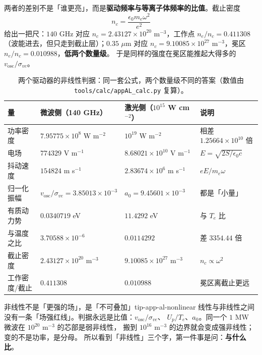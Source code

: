 两者的差别不是「谁更亮」，而是\textbf{驱动频率与等离子体频率的比值}。截止密度
\begin{equation}
n_c = \frac{\epsilon_0m_e\omega^2}{e^2}
\label{eq:app-al-nc}
\end{equation}
给出一把尺：$140$ GHz 对应 $n_c = 2.43127\times10^{20}$ m$^{-3}$，工作点
$n_e/n_c = 0.411308$（波能进去，但只走到截止层）；$0.35$ $\mu$m 对应
$n_c = 9.10085\times10^{27}$ m$^{-3}$，冕区 $n_e/n_c = 0.010988$，\textbf{低两个数量级}。
于是同样的强度在冕区能推起大得多的 $v_{\mathrm{osc}}/\sigma_{ve}$。

\begin{table}[htbp]
\centering
\small
\caption{两个驱动器的非线性判据：同一套公式，两个数量级不同的答案（数值由 \texttt{tools/\allowbreak{}calc/\allowbreak{}appAL\_calc.py} 复算）。}
\label{tab:app-al-nonlinear}
\begin{tabular}{p{3.0cm}p{3.4cm}p{3.4cm}p{3.6cm}}
\toprule
量 & 微波侧（140 GHz） & 激光侧（$10^{15}$ W cm$^{-2}$） & 说明 \\
\midrule
功率密度 & $7.95775\times10^{8}$ W m$^{-2}$ & $10^{19}$ W m$^{-2}$ & 相差 $1.25664\times10^{10}$ 倍 \\
电场 & $774329$ V m$^{-1}$ & $8.68021\times10^{10}$ V m$^{-1}$ & $E = \sqrt{2S/\epsilon_0c}$ \\
抖动速度 & $154824$ m s$^{-1}$ & $2.83674\times10^{6}$ m s$^{-1}$ & $eE/m_e\omega$ \\
归一化振幅 & $v_{\mathrm{osc}}/\sigma_{ve} = 3.85013\times10^{-3}$ & $a_0 = 9.45601\times10^{-3}$ & 都是「小量」 \\
有质动力势 & $0.0340719$ eV & $11.4292$ eV & 与 $T_e$ 比 \\
与温度之比 & $3.70588\times10^{-6}$ & $0.0114292$ & 差 $3354.44$ 倍 \\
截止密度 & $2.43127\times10^{20}$ m$^{-3}$ & $9.10085\times10^{27}$ m$^{-3}$ & $n_c \propto \omega^2$ \\
工作密度/截止 & $0.411308$ & $0.010988$ & 冕区离截止更远 \\
\bottomrule
\end{tabular}

\end{table}

\begin{tip}{非线性不是「更强的场」，是「不可叠加」}{tip-app-al-nonlinear}
线性与非线性之间没有一条「场强红线」。判据永远是比值：$v_{\mathrm{osc}}/\sigma_{ve}$、
$U_p/T_e$、$a_0$。同一个 $1$ MW 微波在 $10^{20}$ m$^{-3}$ 的芯部是弱非线性，
搬到 $10^{16}$ m$^{-3}$ 的边界就会变成强非线性；变的不是功率，是分母。
所以看到「非线性」三个字，第一件事是问：\textbf{与什么比}。
\end{tip}

